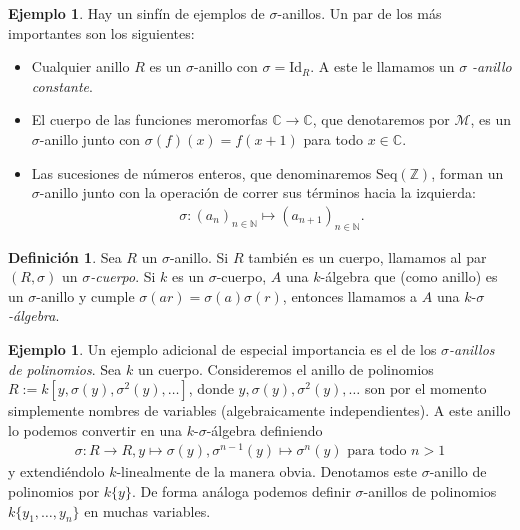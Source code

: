 \documentclass[letterpaper]{article}
\def\N{\mathbb{N}}
\def\Z{\mathbb{Z}}
\def\C{\mathbb{C}}
\def\fa{\text{ para todo }}
\def\Id{\text{Id}}
\theoremstyle{definition}
\newtheorem{ex}[Satz]{Ejemplo}
\newtheorem{defn}[Satz]{Definici\'on}
\begin{document}
\begin{ex} Hay un sinf\'in de ejemplos de $\sigma$-anillos. Un par de los m\'as importantes son los siguientes:

\begin{itemize}
\item Cualquier anillo $R$ es un $\sigma$-anillo con $\sigma = \Id_R$. A este le llamamos un $\sigma$ \emph{-anillo constante}.
\item El cuerpo de las funciones meromorfas $\C \rightarrow \C$, que denotaremos por $\mathcal{M}$,
 es un $\sigma$-anillo junto con $\sigma(f)(x) = f(x+1)$ para todo $x \in \C$.
\item Las sucesiones de n\'umeros enteros, que denominaremos $\text{Seq}(\Z)$, forman un $\sigma$-anillo junto con la operaci\'on de correr sus t\'erminos hacia la izquierda:
\begin{align*} \sigma: (a_n)_{n \in \N} \mapsto (a_{n+1})_{n \in \N}. \end{align*}
\end{itemize}
\end{ex}

\begin{defn}
Sea $R$ un $\sigma$-anillo. Si $R$ tambi\'en es un cuerpo, llamamos al par $(R,\sigma)$ un $\sigma$\emph{-cuerpo}. 
Si $k$ es un $\sigma$-cuerpo, $A$ una $k$-\'algebra que (como anillo) es un $\sigma$-anillo y cumple
$\sigma(ar) = \sigma(a) \sigma(r)$, entonces llamamos a $A$ una  $k$-$\sigma$\emph{-\'algebra}.
\end{defn}

\begin{ex}
Un ejemplo adicional de especial importancia es el de los $\sigma$\emph{-anillos de polinomios}.
Sea $k$ un cuerpo. Consideremos el anillo de polinomios $R:= k[y,\sigma(y),\sigma^2(y),\ldots]$,
 donde $y,\sigma(y),\sigma^2(y),\ldots$ son por el momento simplemente nombres de variables (algebraicamente independientes).
A este anillo lo podemos convertir en una $k$-$\sigma$-\'algebra definiendo 
\begin{align*} 
\sigma:  R \rightarrow R, y \mapsto \sigma(y), \sigma^{n-1}(y) \mapsto \sigma^{n}(y) \fa n > 1 
\end{align*}
y extendi\'endolo $k$-linealmente de la manera obvia. Denotamos este $\sigma$-anillo de polinomios por $k\{y\}$. De forma an\'aloga podemos definir $\sigma$-anillos de polinomios $k\{y_1, \ldots, y_n \}$ en muchas variables.
\end{ex}
\end{document}
